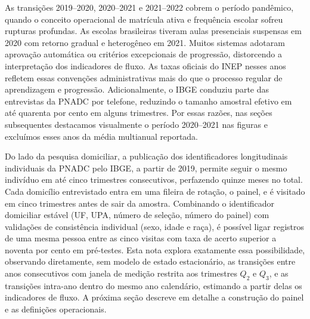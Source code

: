 As transições 2019--2020, 2020--2021 e 2021--2022 cobrem o período
pandêmico, quando o conceito operacional de matrícula ativa e
frequência escolar sofreu rupturas profundas. As escolas brasileiras
tiveram aulas presenciais suspensas em 2020 com retorno gradual e
heterogêneo em 2021. Muitos sistemas adotaram aprovação automática
ou critérios excepcionais de progressão, distorcendo a interpretação
dos indicadores de fluxo. As taxas oficiais do INEP nesses anos
refletem essas convenções administrativas mais do que o processo
regular de aprendizagem e progressão. Adicionalmente, o IBGE
conduziu parte das entrevistas da PNADC por telefone, reduzindo o
tamanho amostral efetivo em até quarenta por cento em alguns
trimestres. Por essas razões, nas seções subsequentes destacamos
visualmente o período 2020--2021 nas figuras e excluímos esses anos
da média multianual reportada.

Do lado da pesquisa domiciliar, a publicação dos identificadores
longitudinais individuais da PNADC pelo IBGE, a partir de 2019,
permite seguir o mesmo indivíduo em até cinco trimestres
consecutivos, perfazendo quinze meses no total. Cada domicílio
entrevistado entra em uma fileira de rotação, o painel, e é
visitado em cinco trimestres antes de sair da amostra. Combinando o
identificador domiciliar estável (UF, UPA, número de seleção,
número do painel) com validações de consistência individual (sexo,
idade e raça), é possível ligar registros de uma mesma pessoa
entre as cinco visitas com taxa de acerto superior a noventa por
cento em pré-testes. Esta nota explora exatamente essa
possibilidade, observando diretamente, sem modelo de estado
estacionário, as transições entre anos consecutivos com janela de
medição restrita aos trimestres $Q_2$ e $Q_3$, e as transições
intra-ano dentro do mesmo ano calendário, estimando a partir delas
os indicadores de fluxo. A próxima seção descreve em detalhe a
construção do painel e as definições operacionais.
